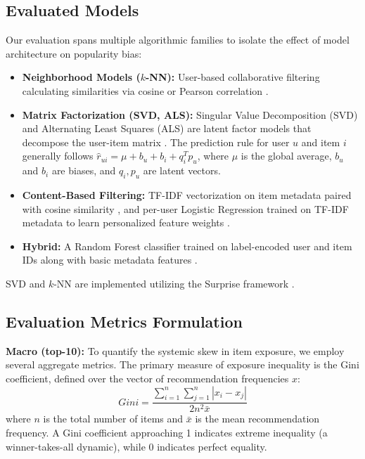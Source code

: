 \documentclass[conference]{IEEEtran}
\begin{document}
\subsection{Evaluated Models}

Our evaluation spans multiple algorithmic families to isolate the effect of model architecture on popularity bias:
\begin{itemize}
    \item \textbf{Neighborhood Models ($k$-NN):} User-based collaborative filtering calculating similarities via cosine or Pearson correlation \cite{sarwar2001item}.
    \item \textbf{Matrix Factorization (SVD, ALS):} Singular Value Decomposition (SVD) and Alternating Least Squares (ALS) are latent factor models that decompose the user-item matrix \cite{koren2009matrix,hu2008collaborative}. The prediction rule for user $u$ and item $i$ generally follows $\hat{r}_{ui} = \mu + b_u + b_i + q_i^T p_u$, where $\mu$ is the global average, $b_u$ and $b_i$ are biases, and $q_i, p_u$ are latent vectors.
    \item \textbf{Content-Based Filtering:} TF-IDF vectorization on item metadata paired with cosine similarity \cite{manning2008introduction}, and per-user Logistic Regression trained on TF-IDF metadata to learn personalized feature weights \cite{pedregosa2011scikit}.
    \item \textbf{Hybrid:} A Random Forest classifier trained on label-encoded user and item IDs along with basic metadata features \cite{breiman2001random}.
\end{itemize}
SVD and $k$-NN are implemented utilizing the Surprise framework \cite{hug2020surprise}.

\subsection{Evaluation Metrics Formulation}

\textbf{Macro (top-10):} To quantify the systemic skew in item exposure, we employ several aggregate metrics. The primary measure of exposure inequality is the Gini coefficient, defined over the vector of recommendation frequencies $x$:
\begin{equation}
    Gini = \frac{\sum_{i=1}^{n} \sum_{j=1}^{n} |x_i - x_j|}{2 n^2 \bar{x}}
\end{equation}
where $n$ is the total number of items and $\bar{x}$ is the mean recommendation frequency. A Gini coefficient approaching 1 indicates extreme inequality (a winner-takes-all dynamic), while 0 indicates perfect equality.
\end{document}
